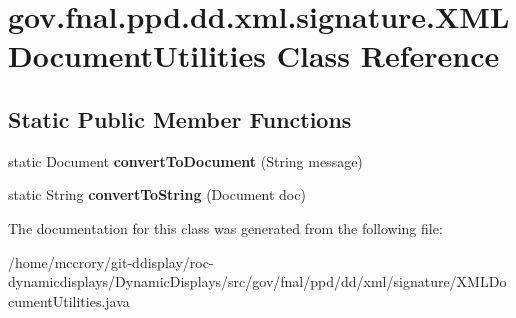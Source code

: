 \hypertarget{classgov_1_1fnal_1_1ppd_1_1dd_1_1xml_1_1signature_1_1XMLDocumentUtilities}{\section{gov.\-fnal.\-ppd.\-dd.\-xml.\-signature.\-X\-M\-L\-Document\-Utilities Class Reference}
\label{classgov_1_1fnal_1_1ppd_1_1dd_1_1xml_1_1signature_1_1XMLDocumentUtilities}
}
\subsection*{Static Public Member Functions}
\begin{DoxyCompactItemize}
\item 
\hypertarget{classgov_1_1fnal_1_1ppd_1_1dd_1_1xml_1_1signature_1_1XMLDocumentUtilities_a5113e903c8c8049153bc4b3d6c43da1a}{static Document {\bfseries convert\-To\-Document} (String message)}\label{classgov_1_1fnal_1_1ppd_1_1dd_1_1xml_1_1signature_1_1XMLDocumentUtilities_a5113e903c8c8049153bc4b3d6c43da1a}

\item 
\hypertarget{classgov_1_1fnal_1_1ppd_1_1dd_1_1xml_1_1signature_1_1XMLDocumentUtilities_a9eed59a958a4e4e56f1b7dcc904cbc90}{static String {\bfseries convert\-To\-String} (Document doc)}\label{classgov_1_1fnal_1_1ppd_1_1dd_1_1xml_1_1signature_1_1XMLDocumentUtilities_a9eed59a958a4e4e56f1b7dcc904cbc90}

\end{DoxyCompactItemize}


The documentation for this class was generated from the following file\-:\begin{DoxyCompactItemize}
\item 
/home/mccrory/git-\/ddisplay/roc-\/dynamicdisplays/\-Dynamic\-Displays/src/gov/fnal/ppd/dd/xml/signature/X\-M\-L\-Document\-Utilities.\-java\end{DoxyCompactItemize}
